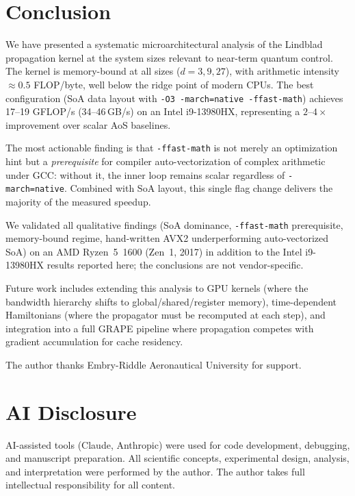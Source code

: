 \documentclass[a4paper,noarxiv]{quantumarticle}
\begin{document}
\section{Conclusion}
\label{sec:conclusion}

We have presented a systematic microarchitectural analysis of the Lindblad
propagation kernel at the system sizes relevant to near-term quantum
control. The kernel is memory-bound at all sizes ($d = 3, 9, 27$), with
arithmetic intensity $\approx 0.5$ FLOP/byte, well below the ridge point
of modern CPUs. The best configuration (SoA data layout with
\texttt{-O3 -march=native -ffast-math}) achieves 17--19 GFLOP/s
(34--46\,GB/s) on an Intel i9-13980HX, representing a $2$--$4\times$
improvement over scalar AoS baselines.

The most actionable finding is that \texttt{-ffast-math} is not merely an
optimization hint but a \emph{prerequisite} for compiler auto-vectorization
of complex arithmetic under GCC: without it, the inner loop remains scalar
regardless of \texttt{-march=native}. Combined with SoA layout, this
single flag change delivers the majority of the measured speedup.

We validated all qualitative findings (SoA dominance, \texttt{-ffast-math}
prerequisite, memory-bound regime, hand-written AVX2 underperforming
auto-vectorized SoA) on an AMD Ryzen~5~1600 (Zen~1, 2017) in addition to
the Intel i9-13980HX results reported here; the conclusions are not
vendor-specific.

Future work includes extending this analysis to GPU kernels (where the
bandwidth hierarchy shifts to global/shared/register memory), time-dependent
Hamiltonians (where the propagator must be recomputed at each step), and
integration into a full GRAPE pipeline where propagation competes with
gradient accumulation for cache residency.

\begin{acknowledgments}
The author thanks Embry-Riddle Aeronautical University for support.
\end{acknowledgments}

\appendix

\section{AI Disclosure}
AI-assisted tools (Claude, Anthropic) were used for code development, debugging, and manuscript preparation. All scientific concepts, experimental design, analysis, and interpretation were performed by the author. The author takes full intellectual responsibility for all content.



\end{document}
